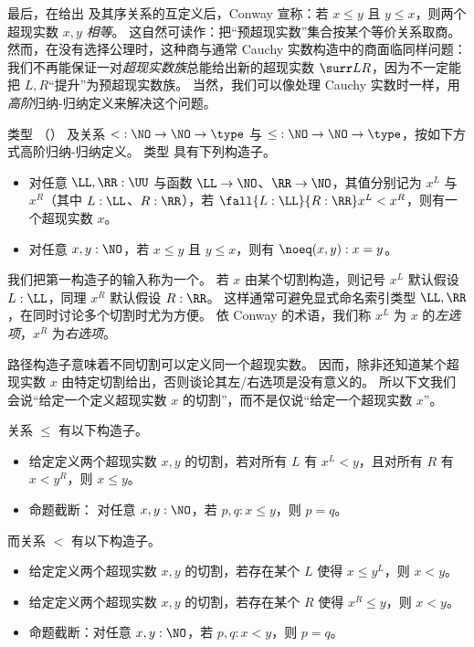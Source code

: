 最后，在给出 \NO 及其序关系的互定义后，Conway 宣称：若 $x\le y$ 且 $y\le x$，则两个超现实数 $x,y$ \emph{相等}。
这自然可读作：把“预超现实数”集合按某个等价关系取商。
然而，在没有选择公理时，这种商与通常 Cauchy 实数构造中的商面临同样问题：我们不再能保证一对\emph{超现实数族}总能给出新的超现实数 $\surr L R$，因为不一定能把 $L,R$“提升”为预超现实数族。
当然，我们可以像处理 Cauchy 实数时一样，用\emph{高阶}归纳-归纳定义来解决这个问题。

\begin{defn}\label{defn:surreals}
  类型 \NO（）
  及关系 $\mathord<:\NO\to\NO\to\type$ 与 $\mathord\le:\NO\to\NO\to\type$，按如下方式高阶归纳-归纳定义。
  类型 \NO 具有下列构造子。
  \begin{itemize}
  \item 对任意 $\LL,\RR:\UU$ 与函数 $\LL\to \NO$、$\RR\to \NO$，其值分别记为 $x^L$ 与 $x^R$（其中 $L:\LL$、$R:\RR$），若 $\fall{L:\LL}{R:\RR} x^L<x^R$，则有一个超现实数 $x$。
  \item 对任意 $x,y:\NO$，若 $x\le y$ 且 $y\le x$，则有 $\noeq(x,y):x=y$。
  \end{itemize}
  我们把第一构造子的输入称为一个。
  若 $x$ 由某个切割构造，则记号 $x^L$ 默认假设 $L:\LL$，同理 $x^R$ 默认假设 $R:\RR$。
  这样通常可避免显式命名索引类型 $\LL,\RR$，在同时讨论多个切割时尤为方便。
  依 Conway 的术语，我们称 $x^L$ 为 $x$ 的\emph{左选项}，$x^R$ 为\emph{右选项}。

  路径构造子意味着不同切割可以定义同一个超现实数。
  因而，除非还知道某个超现实数 $x$ 由特定切割给出，否则谈论其左/右选项是没有意义的。
  所以下文我们会说“给定一个定义超现实数 $x$ 的切割”，而不是仅说“给定一个超现实数 $x$”。

  关系 $\le$ 有以下构造子。
  \begin{itemize}
  \item 给定定义两个超现实数 $x,y$ 的切割，若对所有 $L$ 有 $x^L<y$，且对所有 $R$ 有 $x<y^R$，则 $x\le y$。
  \item 命题截断：
    对任意 $x,y:\NO$，若 $p,q:x\le y$，则 $p=q$。
  \end{itemize}
  而关系 $<$ 有以下构造子。
  \begin{itemize}
  \item 给定定义两个超现实数 $x,y$ 的切割，若存在某个 $L$ 使得 $x\le y^L$，则 $x<y$。
  \item 给定定义两个超现实数 $x,y$ 的切割，若存在某个 $R$ 使得 $x^R\le y$，则 $x<y$。
  \item 命题截断：对任意 $x,y:\NO$，若 $p,q:x<y$，则 $p=q$。
  \end{itemize}
\end{defn}

